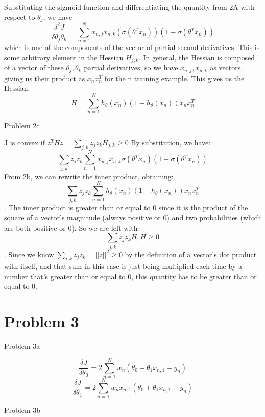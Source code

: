 \documentclass[11pt]{article}
\newcommand{\solution}[1]{{{\color{blue}{\bf Solution:} {#1}}}}
\begin{document}
\solution{
Substituting the sigmoid function and differentiating the quantity from 2A with respect to $\theta_j$, we have
\[
\frac{\delta^{2}J}{\delta \theta_j \theta_k} = \sum_{n=1}^{N} x_{n,j}x_{n,k}(\sigma(\theta^{T}x_n))(1-\sigma(\theta^{T}x_n))
\]
which is one of the components of the vector of partial second derivatives. This is some arbitrary element in the Hessian $H_{j,k}$. In general, the Hessian is composed of a vector of these $\theta_j, \theta_k$ partial derivatives, so we have $x_{n,j}, x_{n,k}$ as vectors, giving us their product as $x_{n}x_{n}^{T}$ for the n training example. This gives us the Hessian: 
\[ H = \sum_{n=1}^{N} h_{\theta}(x_n)(1 - h_{\theta}(x_n))x_{n}x_{n}^{T} \]
}
\vspace{1cm}

\item Problem 2c

\solution{
J is convex if $z^{T}Hz = \sum_{j,k}z_{j}z_{k}H_{j,k} \geq 0$
By substitution, we have:
\[\sum_{j,k}z_{j}z_{k} \sum_{n=1}^{N}x_{n,j}x_{n,k}\sigma(\theta^{T}x_n)(1-\sigma(\theta^{T}x_n)) \]
From 2b, we can rewrite the inner product, obtaining: 
\[\sum_{j,k}z_{j}z_{k}\sum_{n=1}^{N} h_{\theta}(x_n)(1 - h_{\theta}(x_n))x_{n}x_{n}^{T} \]. 
The inner product is greater than or equal to 0 since it is the product of the square of a vector's magnitude (always positive or 0) and two probabilities (which are both positive or 0). So we are left with \[\sum_{j,k}z_{j}z_{k}H, H \geq 0\]. Since we know $\sum_{j,k} z_{j}z_{k} = ||z||^{2} \geq 0$ by the definition of a vector's dot product with itself, and that sum in this case is just being multiplied each time by a number that's greater than or equal to 0, this quantity has to be greater than or equal to 0. 
}
\newpage

\section{Problem 3}
\item Problem 3a

\solution{
\[ \frac{\delta J}{\delta \theta_0} = 2\sum_{n=1}^{N} w_{n}(\theta_0 + \theta_{1}x_{n,1} - y_{n}) \]
\[ \frac{\delta J}{\delta \theta_1} = 2 \sum_{n=1}^{N} w_{n}x_{n,1}(\theta_0 + \theta_{1}x_{n,1} - y_{n}) \]
}

\vspace{1cm}
\item Problem 3b
\end{document}

